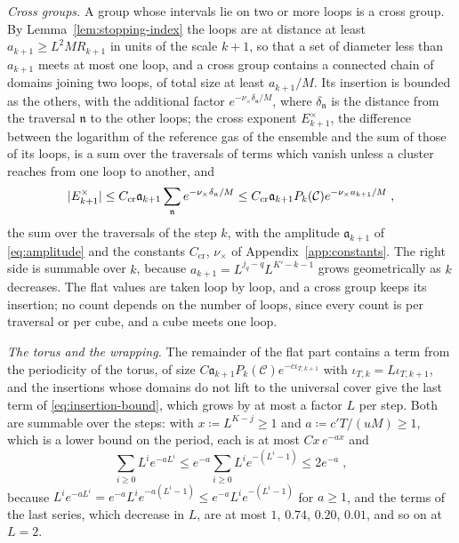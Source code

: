 \documentclass[11pt]{preprint}
\DeclarePairedDelimiter{\abs}{\lvert}{\rvert}
\numberwithin{equation}{section}
\theoremstyle{definition}
\theoremstyle{remark}
\theoremstyle{plain}
\begin{document}
\emph{Cross groups.} A group whose intervals lie on two or more loops is a cross group. By Lemma~\ref{lem:stopping-index} the loops are at distance at least $a_{k+1} \geq L^2MR_{k+1}$ in units of the scale $k + 1$, so that a set of diameter less than $a_{k+1}$ meets at most one loop, and a cross group contains a connected chain of domains joining two loops, of total size at least $a_{k+1}/M$. Its insertion is bounded as the others, with the additional factor $e^{-\nu_\times\delta_{\mathfrak n}/M}$, where $\delta_{\mathfrak n}$ is the distance from the traversal $\mathfrak n$ to the other loops; the cross exponent $E^\times_{k+1}$, the difference between the logarithm of the reference gas of the ensemble and the sum of those of its loops, is a sum over the traversals of terms which vanish unless a cluster reaches from one loop to another, and
\begin{equation}\label{eq:cross-exponent}
    \abs{E^\times_{k+1}} \leq C_{\mathrm{cr}}\mathfrak a_{k+1}\sum_{\mathfrak n}e^{-\nu_\times\delta_{\mathfrak n}/M} \leq C_{\mathrm{cr}}\mathfrak a_{k+1}P_k(\mathcal C)e^{-\nu_\times a_{k+1}/M}\;,
\end{equation}
the sum over the traversals of the step $k$, with the amplitude $\mathfrak a_{k+1}$ of \eqref{eq:amplitude} and the constants $C_{\mathrm{cr}}$, $\nu_\times$ of Appendix~\ref{app:constants}. The right side is summable over $k$, because $a_{k+1} = L^{j_q-q}L^{K'-k-1}$ grows geometrically as $k$ decreases. The flat values are taken loop by loop, and a cross group keeps its insertion; no count depends on the number of loops, since every count is per traversal or per cube, and a cube meets one loop.

\emph{The torus and the wrapping.} The remainder of the flat part contains a term from the periodicity of the torus, of size $C\mathfrak a_{k+1}P_k(\mathcal C)e^{-c\iota_{T,k+1}}$ with $\iota_{T,k} = L\iota_{T,k+1}$, and the insertions whose domains do not lift to the universal cover give the last term of \eqref{eq:insertion-bound}, which grows by at most a factor $L$ per step. Both are summable over the steps: with $x \coloneqq L^{K-j} \geq 1$ and $a \coloneqq c'T/(uM) \geq 1$, which is a lower bound on the period, each is at most $Cx\,e^{-ax}$ and
\begin{equation}\label{eq:wrap-sum}
    \sum_{i \geq 0}L^ie^{-aL^i} \leq e^{-a}\sum_{i \geq 0}L^ie^{-(L^i - 1)} \leq 2e^{-a}\;,
\end{equation}
because $L^ie^{-aL^i} = e^{-a}L^ie^{-a(L^i - 1)} \leq e^{-a}L^ie^{-(L^i - 1)}$ for $a \geq 1$, and the terms of the last series, which decrease in $L$, are at most $1$, $0.74$, $0.20$, $0.01$, and so on at $L = 2$.
\end{document}
